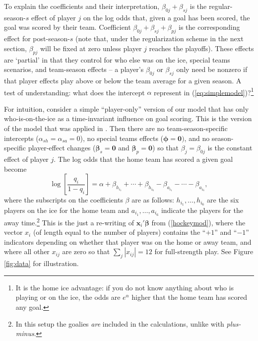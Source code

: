 To explain the coefficients and their interpretation, 
$\beta_{0j} + \beta_{sj}$ is the regular-season-$s$ effect of player $j$ on the log
odds that, given a goal has been scored, the goal was scored by their team.  Coefficient 
$\beta_{0j} + \beta_{sj} + \beta_{pj}$ is the corresponding effect for post-season-$s$ (note that, under the regularization scheme in the next section, $\beta_{pj}$ will be fixed at zero unless player $j$ reaches the playoffs). 
These effects are `partial' in that they control for who else was on the ice,
special teams scenarios, and team-season effects -- a player's
$\beta_{0j}$ or $\beta_{sj}$ only need be nonzero if that player effects play
above or below the team average for a given season.  A test of
understanding: what does the intercept $\alpha$ represent in
(\ref{eq:simplemodel})?\footnote{It is the home ice advantage: if you do not
know anything about who is playing or on the ice, the odds are $e^{\alpha}$
higher that the home team has scored any goal.}


For intuition, consider a simple ``player-only'' version of our model that has
only who-is-on-the-ice as a time-invariant influence on goal scoring.  This is the version of the model that was applied in \cite{gramacy:jensen:taddy:2013}.  Then
there are no team-season-specific intercepts ($\alpha_{sh}=\alpha_{sa}=0$), no
special teams effects ($\boldsymbol{\phi}=\mathbf{0})$, and no season-specific
player-effect changes ($\boldsymbol{\beta}_s = \mathbf{0}$ and $\boldsymbol{\beta}_p = \mathbf{0}$)  so that $\beta_j
= \beta_{0j}$ is the constant effect of player $j$.  The log odds that the
home team has scored a given goal become \begin{equation} \log
\left[\frac{q_i}{1-q_i} \right]  = \alpha + \beta_{h_{i_1}} + \cdots +
\beta_{h_{i_6}} -  \beta_{a_{i_1}} - \cdots - \beta_{a_{i_6}},
\label{eq:simplemodel} \end{equation} where the subscripts on the coefficients
$\beta$ are as follows: $h_{i_1}, \dots, h_{i_6}$ are the six players on the
ice for the home team and  $a_{i_1}, \dots, a_{i_6}$ indicate the players for
the away time.\footnote{In this setup the goalies {\em are} included in the
calculations, unlike with {\em plus-minus}.}  This is the just a re-writing of
$\mathbf{x}_i'\boldsymbol{\beta}$ from (\ref{hockeymod}), where the vector
$x_i$ (of length equal to the number of players) contains the ``$+1$'' and
``$-1$'' indicators depending on whether that player was on the home or away
team, and where all other $x_{ij}$ are zero so that $\sum_j |x_{ij}| = 12$ for
full-strength play. See Figure \ref{fig:data} for illustration. 


